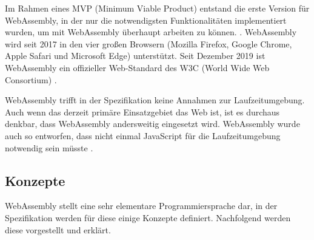 Im Rahmen eines MVP (Minimum Viable Product) entstand die erste Version für Web\-Assembly, in der nur die notwendigsten Funktionalitäten implementiert wurden, um mit WebAssembly überhaupt arbeiten zu können. \cite{WebAssemblyWebsite}. WebAssembly wird seit 2017 in den vier großen Browsern (Mozilla Firefox, Google Chrome, Apple Safari und Microsoft Edge) unterstützt. Seit Dezember 2019 ist WebAssembly ein offizieller Web-Standard des W3C (World Wide Web Consortium) \cite{WebAssemblyW3CPressStandard}.

WebAssembly trifft in der Spezifikation keine Annahmen zur Laufzeitumgebung. Auch wenn das derzeit primäre Einsatzgebiet das Web ist, ist es durchaus denkbar, dass WebAssembly andersweitig eingesetzt wird. WebAssembly wurde auch so entworfen, dass nicht einmal JavaScript für die Laufzeitumgebung notwendig sein müsste \cite{WebAssemblyWebsite}.

\subsection{Konzepte}
\label{subsec:WebAssembly-Konzepte}
WebAssembly stellt eine sehr elementare Programmiersprache dar, in der Spezifikation werden für diese einige Konzepte \cite{WebAssemblySpecification} definiert. Nachfolgend werden diese vorgestellt und erklärt.

